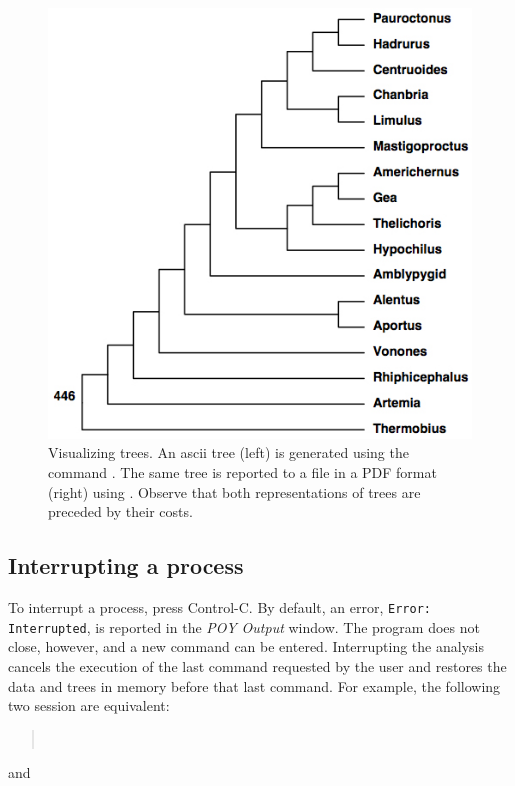 {\begin{figure}
\begin{minipage}[c]{0.5\textwidth}
	   	\includegraphics[width=\textwidth]{doc/figures/pstree.jpg}
   	\end{minipage}
\caption{Visualizing trees. An ascii tree (left) is generated using the command
. The same tree is reported to a file in a PDF format (right) using 
. Observe that both representations of trees  are preceded by their costs.}
\label{fig:trees}
\end{figure}

\subsection{Interrupting a process}
To interrupt a process, press Control-C. By default, an error, \texttt{Error:}\\ \texttt{Interrupted}, is reported in the 
\emph{POY Output} window. The program does not close, however, and a new command can be entered. Interrupting 
the analysis cancels the execution of the last command requested by the user and restores the data and trees in memory 
before that last command. For example, the following two session are equivalent: 

\begin{quote}
 	 \\
\end{quote}
and

}
